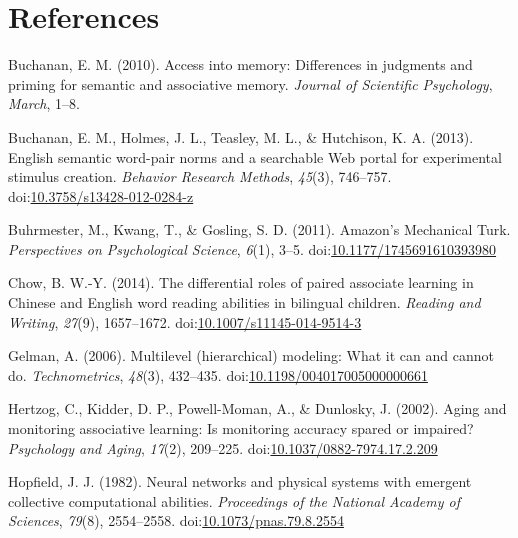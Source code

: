 \documentclass[english,man]{apa6}
\theoremstyle{definition}
\theoremstyle{definition}
\theoremstyle{definition}
\theoremstyle{remark}
\begin{document}
\newpage

\section{References}\label{references}

\setlength{\parindent}{-0.5in} \setlength{\leftskip}{0.5in}

\hypertarget{refs}{}
\hypertarget{ref-Buchanan2010}{}
Buchanan, E. M. (2010). Access into memory: Differences in judgments and
priming for semantic and associative memory. \emph{Journal of Scientific
Psychology}, \emph{March}, 1--8.

\hypertarget{ref-Buchanan2013}{}
Buchanan, E. M., Holmes, J. L., Teasley, M. L., \& Hutchison, K. A.
(2013). English semantic word-pair norms and a searchable Web portal for
experimental stimulus creation. \emph{Behavior Research Methods},
\emph{45}(3), 746--757.
doi:\href{https://doi.org/10.3758/s13428-012-0284-z}{10.3758/s13428-012-0284-z}

\hypertarget{ref-Buhrmester2011}{}
Buhrmester, M., Kwang, T., \& Gosling, S. D. (2011). Amazon's Mechanical
Turk. \emph{Perspectives on Psychological Science}, \emph{6}(1), 3--5.
doi:\href{https://doi.org/10.1177/1745691610393980}{10.1177/1745691610393980}

\hypertarget{ref-Chow2014}{}
Chow, B. W.-Y. (2014). The differential roles of paired associate
learning in Chinese and English word reading abilities in bilingual
children. \emph{Reading and Writing}, \emph{27}(9), 1657--1672.
doi:\href{https://doi.org/10.1007/s11145-014-9514-3}{10.1007/s11145-014-9514-3}

\hypertarget{ref-Gelman2006}{}
Gelman, A. (2006). Multilevel (hierarchical) modeling: What it can and
cannot do. \emph{Technometrics}, \emph{48}(3), 432--435.
doi:\href{https://doi.org/10.1198/004017005000000661}{10.1198/004017005000000661}

\hypertarget{ref-Hertzog2002}{}
Hertzog, C., Kidder, D. P., Powell-Moman, A., \& Dunlosky, J. (2002).
Aging and monitoring associative learning: Is monitoring accuracy spared
or impaired? \emph{Psychology and Aging}, \emph{17}(2), 209--225.
doi:\href{https://doi.org/10.1037/0882-7974.17.2.209}{10.1037/0882-7974.17.2.209}

\hypertarget{ref-Hopfield1982}{}
Hopfield, J. J. (1982). Neural networks and physical systems with
emergent collective computational abilities. \emph{Proceedings of the
National Academy of Sciences}, \emph{79}(8), 2554--2558.
doi:\href{https://doi.org/10.1073/pnas.79.8.2554}{10.1073/pnas.79.8.2554}
\end{document}
